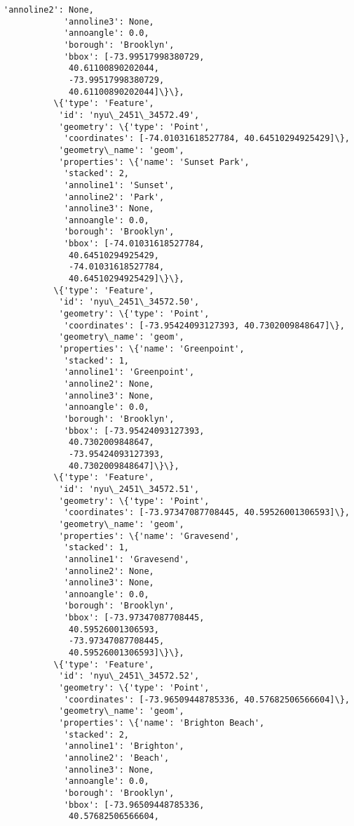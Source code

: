 \documentclass[11pt]{article}
\begin{document}
\begin{Verbatim}[commandchars=\\\{\}]
            'annoline2': None,
            'annoline3': None,
            'annoangle': 0.0,
            'borough': 'Brooklyn',
            'bbox': [-73.99517998380729,
             40.61100890202044,
             -73.99517998380729,
             40.61100890202044]\}\},
          \{'type': 'Feature',
           'id': 'nyu\_2451\_34572.49',
           'geometry': \{'type': 'Point',
            'coordinates': [-74.01031618527784, 40.64510294925429]\},
           'geometry\_name': 'geom',
           'properties': \{'name': 'Sunset Park',
            'stacked': 2,
            'annoline1': 'Sunset',
            'annoline2': 'Park',
            'annoline3': None,
            'annoangle': 0.0,
            'borough': 'Brooklyn',
            'bbox': [-74.01031618527784,
             40.64510294925429,
             -74.01031618527784,
             40.64510294925429]\}\},
          \{'type': 'Feature',
           'id': 'nyu\_2451\_34572.50',
           'geometry': \{'type': 'Point',
            'coordinates': [-73.95424093127393, 40.7302009848647]\},
           'geometry\_name': 'geom',
           'properties': \{'name': 'Greenpoint',
            'stacked': 1,
            'annoline1': 'Greenpoint',
            'annoline2': None,
            'annoline3': None,
            'annoangle': 0.0,
            'borough': 'Brooklyn',
            'bbox': [-73.95424093127393,
             40.7302009848647,
             -73.95424093127393,
             40.7302009848647]\}\},
          \{'type': 'Feature',
           'id': 'nyu\_2451\_34572.51',
           'geometry': \{'type': 'Point',
            'coordinates': [-73.97347087708445, 40.59526001306593]\},
           'geometry\_name': 'geom',
           'properties': \{'name': 'Gravesend',
            'stacked': 1,
            'annoline1': 'Gravesend',
            'annoline2': None,
            'annoline3': None,
            'annoangle': 0.0,
            'borough': 'Brooklyn',
            'bbox': [-73.97347087708445,
             40.59526001306593,
             -73.97347087708445,
             40.59526001306593]\}\},
          \{'type': 'Feature',
           'id': 'nyu\_2451\_34572.52',
           'geometry': \{'type': 'Point',
            'coordinates': [-73.96509448785336, 40.57682506566604]\},
           'geometry\_name': 'geom',
           'properties': \{'name': 'Brighton Beach',
            'stacked': 2,
            'annoline1': 'Brighton',
            'annoline2': 'Beach',
            'annoline3': None,
            'annoangle': 0.0,
            'borough': 'Brooklyn',
            'bbox': [-73.96509448785336,
             40.57682506566604,

\end{Verbatim}
\end{document}
